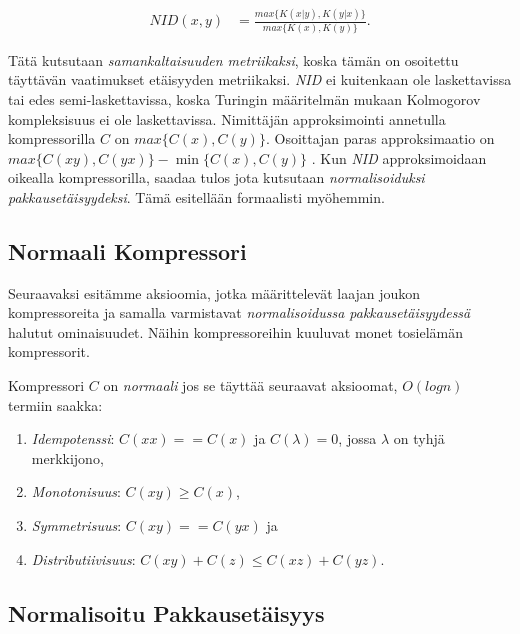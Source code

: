 \documentclass[11pt,finnish]{tktltiki2}
\theoremstyle{definition}
\theoremstyle{remark}
\begin{document}
  \begin{align}
    NID(x,y) &= \frac{ max\{K{(x|y)},K{(y|x)}\} }{ max \{K(x),K(y)\}}.
  \end{align}

  Tätä kutsutaan \emph{samankaltaisuuden metriikaksi}, koska tämän on osoitettu \cite{CV05} täyttävän vaatimukset etäisyyden metriikaksi. \emph{NID} ei kuitenkaan ole laskettavissa tai edes semi-laskettavissa, koska Turingin määritelmän mukaan Kolmogorov kompleksisuus ei ole laskettavissa.
  Nimittäjän approksimointi annetulla kompressorilla $C$ on $max \{C(x),C(y)\}$. Osoittajan paras approksimaatio on $max\{C(xy),C(yx)\} - \min\{C(x),C(y)\}$ \cite{CV05}.
  Kun \emph{NID} approksimoidaan oikealla kompressorilla, saadaa tulos jota kutsutaan \emph{normalisoiduksi pakkausetäisyydeksi}. Tämä esitellään formaalisti myöhemmin.

\subsection{Normaali Kompressori} %
\label{sub:normaali_kompressori}

  Seuraavaksi esitämme aksioomia, jotka määrittelevät laajan joukon kompressoreita ja samalla varmistavat \emph{normalisoidussa pakkausetäisyydessä} halutut ominaisuudet. Näihin kompressoreihin kuuluvat monet tosielämän kompressorit.

  Kompressori $C$ on \emph{normaali} jos se täyttää seuraavat aksioomat, $O(log n)$ termiin saakka:

  \begin{enumerate}
    \item \emph{Idempotenssi}: $C(xx) == C(x)$ ja $C(\lambda) = 0$, jossa $\lambda$ on tyhjä merkkijono,
    \item \emph{Monotonisuus}: $C(xy) \geq C(x)$,
    \item \emph{Symmetrisuus}: $C(xy) == C(yx)$ ja
    \item \emph{Distributiivisuus}: $C(xy) + C(z) \leq C(xz) + C(yz)$.
  \end{enumerate}

\subsection{Normalisoitu Pakkausetäisyys} %
\label{sub:normalisoitu_pakkauset_isyys}
\end{document}
